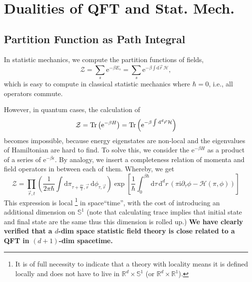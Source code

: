 \section{Dualities of QFT and Stat. Mech.}
\subsection{Partition Function as Path Integral}
In statistic mechanics, we compute the partition functions of fields,
\begin{equation}
  \mathcal{Z} = \sum_{s} \mathrm{e}^{-\beta E_{s}} = \sum_{s} \mathrm{e}^{-\beta \int \mathrm{d} \vec{r} \, \mathcal{H}},
\end{equation}
which is easy to compute in classical statistic mechanics where $\hbar = 0$, i.e., all operators commute.

However, in quantum cases, the calculation of
\begin{equation}
  \mathcal{Z} = \Tr \left( \mathrm{e}^{- \beta H} \right) = \Tr \left( \mathrm{e}^{-\beta \int \mathrm{d}^{d} \vec{r} \, \mathcal{H} } \right) 
\end{equation}
becomes impossible, because energy eigenstates are non-local and the eigenvalues of Hamiltonian are hard to find.
To solve this, we consider the $\mathrm{e}^{-\beta H}$ as a product of a series of $\mathrm{e}^{-\beta \epsilon}$. By analogy, we insert a completeness relation of momenta and field operators in between each of them. Whereby, we get
\begin{equation}
  \mathcal{Z} = \prod_{\vec{r}, t}^{} \left( \frac{1}{2\pi\hbar} \int \mathrm{d} \pi_{\tau + \frac{\delta \tau}{2}, \vec{r}} \, \mathrm{d} \phi_{\tau, \vec{r}}  
  \right)  
  \exp \left[ \frac{1}{\hbar} \int_{0}^{\beta\hbar} \mathrm{d}\tau \,\mathrm{d} ^{d} r\, \left( \pi \mathrm{i}  \partial_{\tau} \phi - \mathcal{H}\left( \pi, \phi \right)  \right) \right] 
\end{equation}
This expression is local
\footnote{
  It is of full necessity to indicate that a theory with locality means it is defined locally and does not have to live in $\mathbb{R}^{d} \times \mathbb{S}^{1}$ (or $\mathbb{R}^{d} \times  \mathbb{R}^{1}$).
}
in space``time'', with the cost of introducing an additional dimension on $\mathbb{S}^{1}$ (note that calculating trace implies that initial state and final state are the same thus this dimension is rolled up.) \textbf{We have clearly verified that a $d$-dim space statistic field theory is close related to a QFT in $(d+1)$-dim spacetime.}

